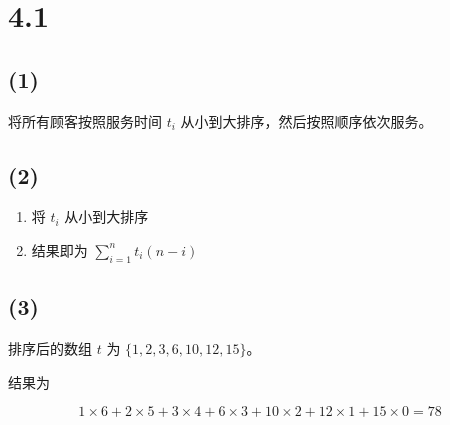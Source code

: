 \section*{4.1}

\subsection*{(1)}

将所有顾客按照服务时间 $t_i$ 从小到大排序，然后按照顺序依次服务。

\subsection*{(2)}

\begin{enumerate}
  \item 将 $t_i$ 从小到大排序
  \item 结果即为 $\sum_{i=1}^{n} t_i (n-i)$
\end{enumerate}

\subsection*{(3)}

排序后的数组 $t$ 为 $\{1,2,3,6,10,12,15\}$。

结果为

$$
1 \times 6 + 2 \times 5 + 3 \times 4 + 6 \times 3 + 10 \times 2 + 12 \times 1 + 15 \times 0
=
78
$$